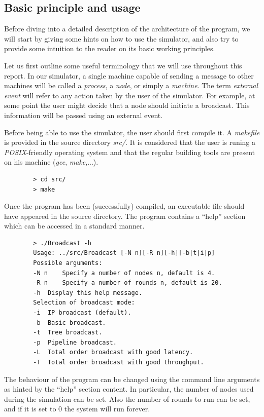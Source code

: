 \documentclass[a4paper]{article}
\begin{document}
        \subsection{Basic principle and usage}
        Before diving into a detailed description of the architecture of the program,
        we will start by giving some hints on how to use the simulator, and also try
        to provide some intuition to the reader on its basic working principles.

        Let us first outline some useful terminology that we will use throughout this
        report. In our simulator, a single machine capable of sending a message to
        other machines will be called a \textit{process}, a \textit{node}, or simply
        a \textit{machine}. The term \textit{external event} will refer to any action
        taken by the user of the simulator. For example, at some point the user might
        decide that a node should initiate a broadcast. This information will be
        passed using an external event.

        Before being able to use the simulator, the user should first compile it. A
        \textit{makefile} is provided in the source directory \textit{src/}. It is
        considered that the user is runing a \textit{POSIX}-friendly operating system
        and that the regular building tools are present on his machine (\textit{gcc},
        \textit{make},...).
        \begin{lstlisting}
        > cd src/
        > make
        \end{lstlisting}

        Once the program has been (successfully) compiled, an executable file should
        have appeared in the source directory. The program contains a ``help'' section
        which can be accessed in a standard manner.
        \begin{lstlisting}
        > ./Broadcast -h
        Usage: ../src/Broadcast [-N n][-R n][-h][-b|t|i|p]
        Possible arguments:
        -N n	Specify a number of nodes n, default is 4.
        -R n	Specify a number of rounds n, default is 20.
        -h	Display this help message.
        Selection of broadcast mode:
        -i	IP broadcast (default).
        -b	Basic broadcast.
        -t	Tree broadcast.
        -p	Pipeline broadcast.
        -L	Total order broadcast with good latency.
        -T	Total order broadcast with good throughput.
        \end{lstlisting}

        The behaviour of the program can be changed using the command line arguments
        as hinted by the ``help'' section content. In particular, the number of nodes
        used during the simulation can be set. Also the number of rounds to run can be
        set, and if it is set to $0$ the system will run forever.
\end{document}
